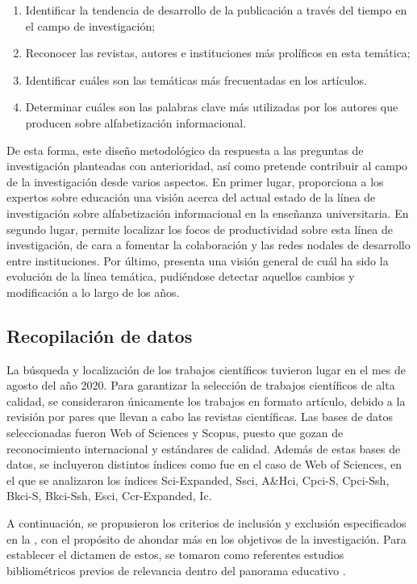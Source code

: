 \documentclass[spanish]{textolivre}
\begin{document}
\begin{enumerate}[label={\alph*}]
    \item Identificar la tendencia de desarrollo de la publicación a través del tiempo en el campo de investigación;
    \item Reconocer las revistas, autores e instituciones más prolíficos en esta temática;
    \item Identificar cuáles son las temáticas más frecuentadas en los artículos.
    \item Determinar cuáles son las palabras clave más utilizadas por los autores que producen sobre alfabetización informacional.
\end{enumerate}

De esta forma, este diseño metodológico da respuesta a las preguntas de investigación planteadas con anterioridad, así como pretende contribuir al campo de la investigación desde varios aspectos. En primer lugar, proporciona a los expertos sobre educación una visión acerca del actual estado de la línea de investigación sobre alfabetización informacional en la enseñanza universitaria. En segundo lugar, permite localizar los focos de productividad sobre esta línea de investigación, de cara a fomentar la colaboración y las redes nodales de desarrollo entre instituciones. Por último, presenta una visión general de cuál ha sido la evolución de la línea temática, pudiéndose detectar aquellos cambios y modificación a lo largo de los años.

\subsection{Recopilación de datos}
La búsqueda y localización de los trabajos científicos tuvieron lugar en el mes de agosto del año 2020. Para garantizar la selección de trabajos científicos de alta calidad, se consideraron únicamente los trabajos en formato artículo, debido a la revisión por pares que llevan a cabo las revistas científicas. Las bases de datos seleccionadas fueron Web of Sciences y Scopus, puesto que gozan de reconocimiento internacional y estándares de calidad. Además de estas bases de datos, se incluyeron distintos índices como fue en el caso de Web of Sciences, en el que se analizaron los índices Sci-Expanded, Ssci, A\&Hci, Cpci-S, Cpci-Ssh, Bkci-S, Bkci-Ssh, Esci, Ccr-Expanded, Ic.

A continuación, se propusieron los criterios de inclusión y exclusión especificados en la , con el propósito de ahondar más en los objetivos de la investigación. Para establecer el dictamen de estos, se tomaron como referentes estudios bibliométricos previos de relevancia dentro del panorama educativo \cite{moreno-guerrero2020, hinojo-lucena2019}. %
\end{document}

